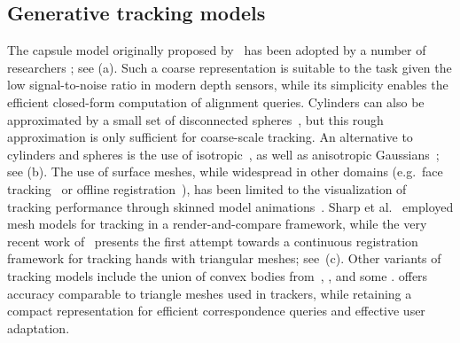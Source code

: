 \subsection*{Generative tracking models}
The capsule model originally proposed by~\cite{rehg1994tracking} has been adopted by a number of researchers \cite{oiko2011hand,schroder2014real,fleishman2015icpik,tagliasacchi2015robust}; see (a). Such a coarse representation is suitable to the task given the low signal-to-noise ratio in modern depth sensors, while its simplicity enables the efficient closed-form computation of alignment queries. Cylinders can also be approximated by a small set of disconnected spheres~\cite{qian2014realtime}, but this rough approximation is only sufficient for coarse-scale tracking. An alternative to cylinders and spheres is the use of isotropic~\cite{sridhar2013multicam,sridhar2015fast}, as well as anisotropic Gaussians~\cite{sridhar2014anisotropic}; see (b).
% 
%
The use of surface meshes, while widespread in other domains (e.g.\ face tracking~\cite{bouaziz2013online} or offline registration~\cite{loper_eccv14}), has been limited to the visualization of tracking performance through skinned model animations~\cite{tompson2014real,schroder2014real}. Sharp et al.~\cite{sharp2015accurate} employed mesh models for tracking in a render-and-compare framework, while the very recent work of~\cite{taylor2016joint} presents the first attempt towards a continuous registration framework for tracking hands with triangular meshes; see~(c).
%
Other variants of tracking models include the union of convex bodies from~\cite{melax2013dynamics}, , and some .
% 
 offers accuracy comparable to triangle meshes used in  trackers, while retaining a compact representation for efficient correspondence queries and effective user adaptation.


